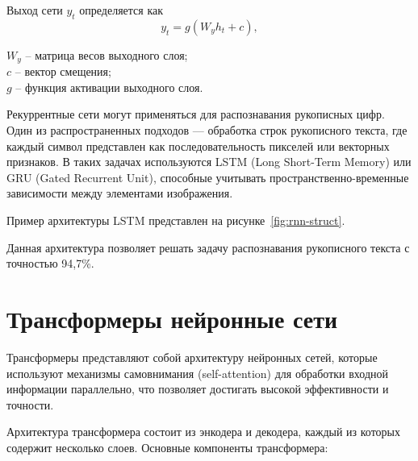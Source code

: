 Выход сети \( y_t \) определяется как
\begin{equation}
    y_t = g(W_y h_t + c),
\end{equation}

 \( W_y \) – матрица весов выходного слоя;\\ 
\hphantom{где} \( c \) – вектор смещения;\\ 
\hphantom{где} \( g \) – функция активации выходного слоя.

\anonsection{}Рекуррентные сети могут применяться для распознавания 
рукописных цифр. Один из распространенных подходов — обработка строк 
рукописного текста, где каждый символ представлен как последовательность 
пикселей или векторных признаков. В таких задачах используются LSTM (Long 
Short-Term Memory) или GRU (Gated Recurrent Unit), способные учитывать 
пространственно-временные зависимости между элементами изображения. 

Пример архитектуры LSTM представлен на рисунке~\ref{fig:rnn-struct}\cite{Varsamopoulos}.


Данная архитектура позволяет решать задачу распознавания рукописного текста с 
точностью 94,7\%.

\section{Трансформеры нейронные сети}\par
\hspace*{12.5 mm}Трансформеры представляют собой архитектуру нейронных сетей, 
которые используют механизмы самовнимания (self-attention) для обработки 
входной информации параллельно, что позволяет достигать высокой эффективности и
точности.

\anonsection{}Архитектура трансформера состоит из энкодера и декодера, 
каждый из которых содержит несколько слоев. Основные компоненты трансформера:


